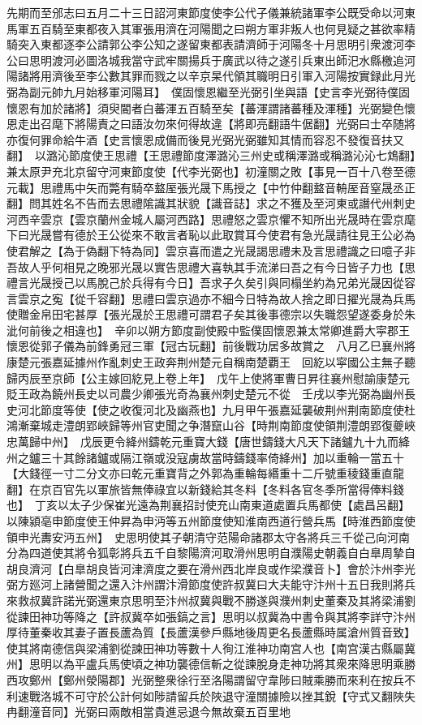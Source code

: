 先期而至邠志曰五月二十三日詔河東節度使李公代子儀兼統諸軍李公既受命以河東馬軍五百騎至東都夜入其軍張用濟在河陽聞之曰朔方軍非叛人也何見疑之甚欲率精騎突入東都逐李公請郭公李公知之遂留東都表請濟師于河陽冬十月思明引衆渡河李公曰思明渡河必圖洛城我當守武牢關揚兵于廣武以待之遂引兵東出師汜水縣檄追河陽諸將用濟後至李公數其罪而戮之以辛京杲代領其職明日引軍入河陽按實録此月光弼為副元帥九月始移軍河陽耳】　僕固懷恩繼至光弼引坐與語【史言李光弼待僕固懷恩有加於諸將】須臾閽者白蕃渾五百騎至矣【蕃渾謂諸蕃種及渾種】光弼變色懷恩走出召麾下將陽責之曰語汝勿來何得故違【將即亮翻語牛倨翻】光弼曰士卒随將亦復何罪命給牛酒【史言懷恩成備而後見光弼光弼雖知其情而容忍不發復音扶又翻】　以潞沁節度使王思禮【王思禮節度澤潞沁三州史或稱澤潞或稱潞沁沁七鴆翻】兼太原尹充北京留守河東節度使【代李光弼也】初潼關之敗【事見一百十八卷至德元載】思禮馬中矢而斃有騎卒盩厔張光晟下馬授之【中竹仲翻盩音輈厔音窒晟丞正翻】問其姓名不告而去思禮隂識其狀貌【識音誌】求之不獲及至河東或譖代州刺史河西辛雲京【雲京蘭州金城人屬河西路】思禮怒之雲京懼不知所出光晟時在雲京麾下曰光晟嘗有德於王公從來不敢言者恥以此取賞耳今使君有急光晟請往見王公必為使君解之【為于偽翻下特為同】雲京喜而遣之光晟謁思禮未及言思禮識之曰噫子非吾故人乎何相見之晚邪光晟以實告思禮大喜執其手流涕曰吾之有今日皆子力也【思禮言光晟授己以馬脫己於兵得有今日】吾求子久矣引與同榻坐約為兄弟光晟因從容言雲京之寃【從千容翻】思禮曰雲京過亦不細今日特為故人捨之即日擢光晟為兵馬使贈金帛田宅甚厚【張光晟於王思禮可謂君子矣其後事德宗以失職怨望遂委身於朱泚何前後之相違也】　辛卯以朔方節度副使殿中監僕固懷恩兼太常卿進爵大寜郡王懷恩從郭子儀為前鋒勇冠三軍【冠古玩翻】前後戰功居多故賞之　八月乙巳襄州將康楚元張嘉延據州作亂刺史王政奔荆州楚元自稱南楚覇王　回紇以寜國公主無子聽歸丙辰至京師【公主嫁回紇見上卷上年】　戊午上使將軍曹日昇往襄州慰諭康楚元貶王政為饒州長史以司農少卿張光奇為襄州刺史楚元不從　壬戌以李光弼為幽州長史河北節度等使【使之收復河北及幽燕也】九月甲午張嘉延襲破荆州荆南節度使杜鴻漸棄城走澧朗郢峽歸等州官吏聞之争潛竄山谷【時荆南節度使領荆澧朗郢復夔峽忠萬歸中州】　戊辰更令絳州鑄乾元重寶大錢【唐世鑄錢大凡天下諸鑪九十九而絳州之鑪三十其餘諸鑪或隔江嶺或没寇虜故當時鑄錢率倚絳州】加以重輪一當五十【大錢徑一寸二分文亦曰乾元重寶背之外郭為重輪每緡重十二斤號重稜錢重直龍翻】在京百官先以軍旅皆無俸祿宜以新錢給其冬料【冬料各官冬季所當得俸料錢也】　丁亥以太子少保崔光遠為荆襄招討使充山南東道處置兵馬都使【處昌呂翻】以陳潁亳申節度使王仲昇為申沔等五州節度使知淮南西道行營兵馬【時淮西節度使領申光夀安沔五州】　史思明使其子朝清守范陽命諸郡太守各將兵三千從己向河南分為四道使其將令狐彰將兵五千自黎陽濟河取滑州思明自濮陽史朝義自白臯周摯自胡良濟河【白臯胡良皆河津濟度之要在滑州西北岸良或作梁濮音卜】會於汴州李光弼方廵河上諸營聞之還入汴州謂汴滑節度使許叔冀曰大夫能守汴州十五日我則將兵來救叔冀許諾光弼還東京思明至汴州叔冀與戰不勝遂與濮州刺史董秦及其將梁浦劉從諫田神功等降之【許叔冀卒如張鎬之言】思明以叔冀為中書令與其將李詳守汴州厚待董秦收其妻子置長蘆為質【長蘆漢參戶縣地後周更名長蘆縣時属滄州質音致】使其將南德信與梁浦劉從諫田神功等數十人徇江淮神功南宫人也【南宫漢古縣屬冀州】思明以為平盧兵馬使頃之神功襲德信斬之從諫脫身走神功將其衆來降思明乘勝西攻鄭州【鄭州滎陽郡】光弼整衆徐行至洛陽謂留守韋陟曰賊乘勝而來利在按兵不利速戰洛城不可守於公計何如陟請留兵於陜退守潼關據險以挫其銳【守式又翻陜失冉翻潼音同】光弼曰兩敵相當貴進忌退今無故棄五百里地